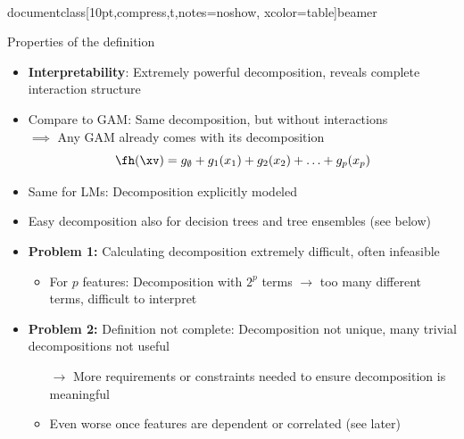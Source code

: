 \\documentclass[10pt,compress,t,notes=noshow, xcolor=table]{beamer}
\begin{document}
\begin{frame}{Properties of the definition}
\begin{itemize}
    \item \textbf{Interpretability}: Extremely powerful decomposition, reveals complete interaction structure
    \pause
    \item Compare to GAM: Same decomposition, but without interactions \\
    $\implies$ Any GAM already comes with its decomposition
    $$
    \fh (\xv) = g_\emptyset + g_1(x_1) + g_2(x_2) + \ldots + g_p(x_p)
    $$
    \item Same for LMs: Decomposition explicitly modeled
    \pause
    \item Easy decomposition also for decision trees and tree ensembles (see below)
    \pause
    \item \textbf{Problem 1:} Calculating decomposition extremely difficult, often infeasible
    \begin{itemize}
        \item For \(p\) features: Decomposition with \(2^p\) terms \(\rightarrow\) too many different terms, difficult to interpret
    \end{itemize}
    \pause
    \item \textbf{Problem 2:} Definition not complete: Decomposition not unique, many trivial decompositions not useful
    \begin{itemize}
        \item[$\rightarrow$] More requirements or constraints needed to ensure decomposition is meaningful
        \item Even worse once features are dependent or correlated (see later)
    \end{itemize}


\end{itemize}
\end{frame}
\end{document}
